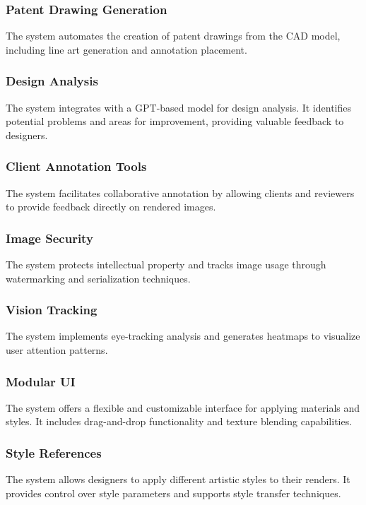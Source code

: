\documentclass{article}
\begin{document}
\subsubsection{Patent Drawing Generation}
The system automates the creation of patent drawings from the CAD model, including line art generation and annotation placement.

\subsubsection{Design Analysis}
The system integrates with a GPT-based model for design analysis. It identifies potential problems and areas for improvement, providing valuable feedback to designers.

\subsubsection{Client Annotation Tools}
The system facilitates collaborative annotation by allowing clients and reviewers to provide feedback directly on rendered images.

\subsubsection{Image Security}
The system protects intellectual property and tracks image usage through watermarking and serialization techniques.

\subsubsection{Vision Tracking}
The system implements eye-tracking analysis and generates heatmaps to visualize user attention patterns.

\subsubsection{Modular UI}
The system offers a flexible and customizable interface for applying materials and styles. It includes drag-and-drop functionality and texture blending capabilities.

\subsubsection{Style References}
The system allows designers to apply different artistic styles to their renders. It provides control over style parameters and supports style transfer techniques.
\end{document}
